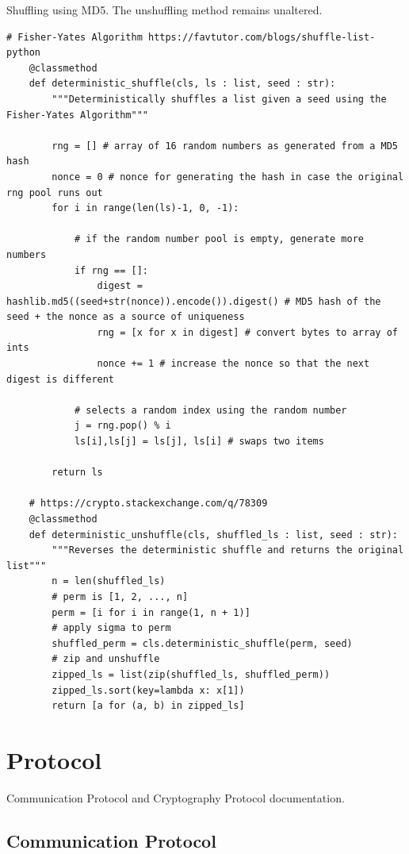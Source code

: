 \documentclass[11pt]{article}
\begin{document}
\begin{Large}
Shuffling using MD5. The unshuffling method remains unaltered.
\end{Large}
\begin{lstlisting}[captionpos=b label=listing:sparql_getallindividuals,
   basicstyle=\ttfamily]
 # Fisher-Yates Algorithm https://favtutor.com/blogs/shuffle-list-python
    @classmethod
    def deterministic_shuffle(cls, ls : list, seed : str):
        """Deterministically shuffles a list given a seed using the Fisher-Yates Algorithm""" 

        rng = [] # array of 16 random numbers as generated from a MD5 hash
        nonce = 0 # nonce for generating the hash in case the original rng pool runs out
        for i in range(len(ls)-1, 0, -1):

            # if the random number pool is empty, generate more numbers 
            if rng == []:
                digest = hashlib.md5((seed+str(nonce)).encode()).digest() # MD5 hash of the seed + the nonce as a source of uniqueness
                rng = [x for x in digest] # convert bytes to array of ints
                nonce += 1 # increase the nonce so that the next digest is different

            # selects a random index using the random number
            j = rng.pop() % i
            ls[i],ls[j] = ls[j], ls[i] # swaps two items
        
        return ls

    # https://crypto.stackexchange.com/q/78309
    @classmethod
    def deterministic_unshuffle(cls, shuffled_ls : list, seed : str):
        """Reverses the deterministic shuffle and returns the original list"""
        n = len(shuffled_ls)
        # perm is [1, 2, ..., n]
        perm = [i for i in range(1, n + 1)]
        # apply sigma to perm
        shuffled_perm = cls.deterministic_shuffle(perm, seed)
        # zip and unshuffle
        zipped_ls = list(zip(shuffled_ls, shuffled_perm))
        zipped_ls.sort(key=lambda x: x[1])
        return [a for (a, b) in zipped_ls]
\end{lstlisting}

\section{Protocol}\label{protocol}


Communication Protocol and Cryptography Protocol documentation.

\subsection{Communication Protocol}\label{communication-protocol}
\end{document}
